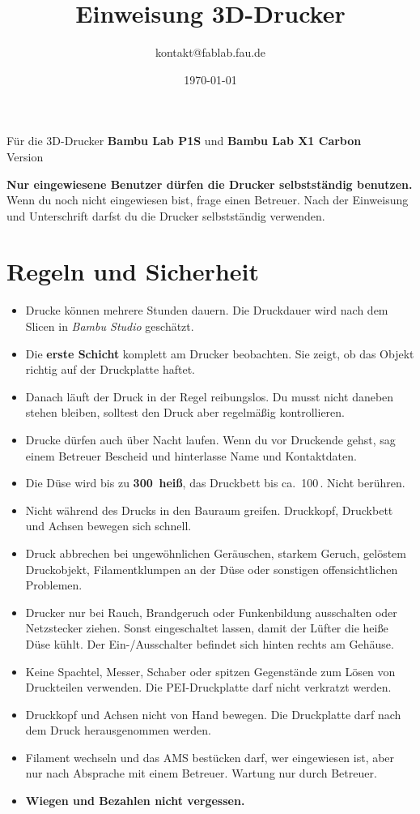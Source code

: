 \documentclass{\basedir/fablab-document}
\date{\today}
\author{kontakt@fablab.fau.de}
\title{Einweisung 3D-Drucker}
\begin{document}
	
	\maketitle
	\begin{center}
		Für die 3D-Drucker \textbf{Bambu Lab P1S} und \textbf{Bambu Lab X1 Carbon}\\[1mm]
		{\small Version \Version}
	\end{center}
	
	\textbf{Nur eingewiesene Benutzer dürfen die Drucker selbstständig benutzen.}
	Wenn du noch nicht eingewiesen bist, frage einen Betreuer. Nach der Einweisung und Unterschrift darfst du die Drucker selbstständig verwenden.
	
	\section{Regeln und Sicherheit}
	
	\begin{itemize}
		\item Drucke können mehrere Stunden dauern. Die Druckdauer wird nach dem Slicen in \textit{Bambu Studio} geschätzt.
		\item Die \textbf{erste Schicht} komplett am Drucker beobachten. Sie zeigt, ob das Objekt richtig auf der Druckplatte haftet.
		\item Danach läuft der Druck in der Regel reibungslos. Du musst nicht daneben stehen bleiben, solltest den Druck aber regelmäßig kontrollieren.
		\item Drucke dürfen auch über Nacht laufen. Wenn du vor Druckende gehst, sag einem Betreuer Bescheid und hinterlasse Name und Kontaktdaten.
		\item Die Düse wird bis zu \textbf{300\,\textcelsius{} heiß}, das Druckbett bis ca.\ 100\,\textcelsius{}. Nicht berühren.
		\item Nicht während des Drucks in den Bauraum greifen. Druckkopf, Druckbett und Achsen bewegen sich schnell.
		\item Druck abbrechen bei ungewöhnlichen Geräuschen, starkem Geruch, gelöstem Druckobjekt, Filamentklumpen an der Düse oder sonstigen offensichtlichen Problemen.
		\item Drucker nur bei Rauch, Brandgeruch oder Funkenbildung ausschalten oder Netzstecker ziehen. Sonst eingeschaltet lassen, damit der Lüfter die heiße Düse kühlt. Der Ein-/Ausschalter befindet sich hinten rechts am Gehäuse.
		\item Keine Spachtel, Messer, Schaber oder spitzen Gegenstände zum Lösen von Druckteilen verwenden. Die PEI-Druckplatte darf nicht verkratzt werden.
		\item Druckkopf und Achsen nicht von Hand bewegen. Die Druckplatte darf nach dem Druck herausgenommen werden.
		\item Filament wechseln und das AMS bestücken darf, wer eingewiesen ist, aber nur nach Absprache mit einem Betreuer. Wartung nur durch Betreuer.
		\item \textbf{Wiegen und Bezahlen nicht vergessen.}
	\end{itemize}
	
\end{document}
